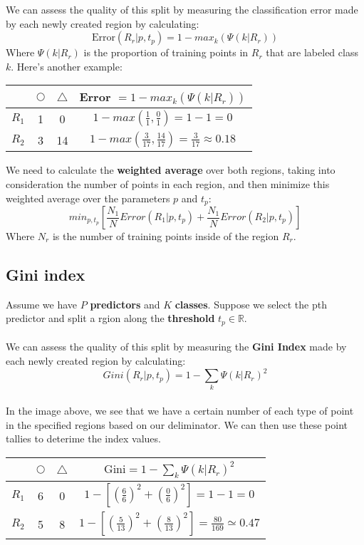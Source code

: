 \documentclass[11pt,a4paper]{report}
\newcommand{\mysubsection}[1]{%
    \subsection{#1}%
    \addcontentsline{toc}{subsection}{#1}%
}
\begin{document}
We can assess the quality of this split by measuring the classification error made by each newly created region by calculating:
$$\textrm{Error}(R_r|p,t_p)= 1 - max_k(\Psi(k|R_r))$$
Where $\Psi(k|R_r)$ is the proportion of training points in $R_r$ that are labeled class $k$. Here's another example:\\
\begin{center}
\begin{tabular}{ |c|c|c|c| } 
 \hline
  & $\bigcirc$ & $\triangle$ & Error $= 1-max_k(\Psi(k|R_r))$\\\hline\hline
 $R_1$ & 1 & 0 & $1 - max(\frac{1}{1}, \frac{0}{1})= 1-1=0$\\\hline
 $R_2$ & 3 & 14 & $1 - max(\frac{3}{17}, \frac{14}{17}) = \frac{3}{17} \approx 0.18$\\\hline
\end{tabular}
\end{center}
We need to calculate the \textbf{weighted average} over both regions, taking into consideration the number of points in each region, and then minimize this weighted average over the parameters $p$ and $t_p$:
$$min_{p,t_p}\left[\frac{N_1}{N}Error(R_1|p,t_p)+\frac{N_1}{N}Error(R_2|p,t_p)\right]$$
Where $N_r$ is the number of training points inside of the region $R_r$.
\mysubsection{Gini index}
Assume we have $P$ \textbf{predictors} and $K$ \textbf{classes}. Suppose we select the pth predictor and split a rgion along the \textbf{threshold} $t_p\in\mathbb{R}$.\\\\We can assess the quality of this split by measuring the \textbf{Gini Index} made by each newly created region by calculating:
$$Gini(R_r|p,t_p) = 1 - \sum_{k}\Psi(k|R_r)^2 $$
\\
In the image above, we see that we have a certain number of each type of point in the specified regions based on our deliminator. We can then use these point tallies to deterime the index values.\\
\begin{center}
\begin{tabular}{ |c|c|c|c| } 
 \hline
  & $\bigcirc$ & $\triangle$ & $\textrm{Gini}= 1-\sum_k\Psi(k|R_r)^2$\\\hline\hline
 $R_1$ & 6 & 0 & $1 - \left[\left(\frac{6}{6}\right)^2 + \left(\frac{0}{6}\right)^2 \right] = 1-1=0$\\\hline
 $R_2$ & 5 & 8 & $1 - \left[\left(\frac{5}{13}\right)^2 + \left(\frac{8}{13}\right)^2 \right] = \frac{80}{169} \simeq 0.47$\\\hline
\end{tabular}
\end{center}
\end{document}
